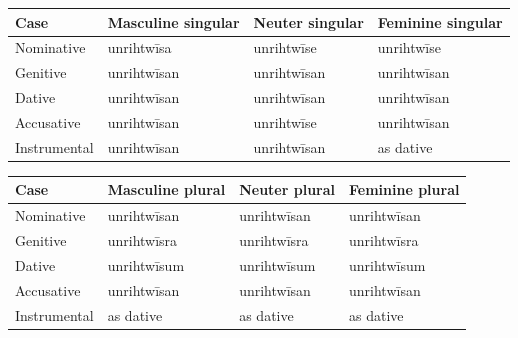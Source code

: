 \par\begingroup
\fontsize{10.5}{13.2}\selectfont
\setlength{\LTleft}{0pt}\setlength{\LTright}{\fill}
\noindent
\begin{tabular}{@{}>{\raggedright\arraybackslash}p{22.0mm}>{\raggedright\arraybackslash}p{31.188mm}>{\raggedright\arraybackslash}p{31.188mm}>{\raggedright\arraybackslash}p{31.188mm}@{}}
\toprule
\textbf{Case} & \textbf{Masculine singular} & \textbf{Neuter singular} & \textbf{Feminine singular} \\
\midrule
Nominative & unrihtwīsa & unrihtwīse & unrihtwīse \\
Genitive & unrihtwīsan & unrihtwīsan & unrihtwīsan \\
Dative & unrihtwīsan & unrihtwīsan & unrihtwīsan \\
Accusative & unrihtwīsan & unrihtwīse & unrihtwīsan \\
Instrumental & unrihtwīsan & unrihtwīsan & as dative \\
\bottomrule
\end{tabular}
\par\endgroup
\par\addvspace{5pt}
\par\begingroup
\fontsize{10.5}{13.2}\selectfont
\setlength{\LTleft}{0pt}\setlength{\LTright}{\fill}
\noindent
\begin{tabular}{@{}>{\raggedright\arraybackslash}p{22.0mm}>{\raggedright\arraybackslash}p{31.188mm}>{\raggedright\arraybackslash}p{31.188mm}>{\raggedright\arraybackslash}p{31.188mm}@{}}
\toprule
\textbf{Case} & \textbf{Masculine plural} & \textbf{Neuter plural} & \textbf{Feminine plural} \\
\midrule
Nominative & unrihtwīsan & unrihtwīsan & unrihtwīsan \\
Genitive & unrihtwīsra & unrihtwīsra & unrihtwīsra \\
Dative & unrihtwīsum & unrihtwīsum & unrihtwīsum \\
Accusative & unrihtwīsan & unrihtwīsan & unrihtwīsan \\
Instrumental & as dative & as dative & as dative \\
\bottomrule
\end{tabular}
\par\endgroup

